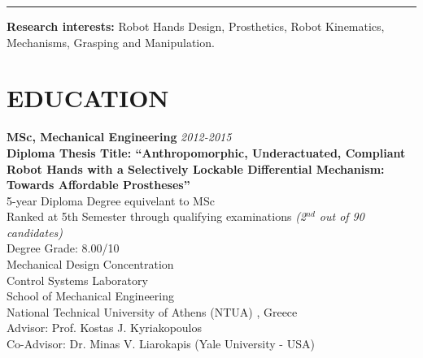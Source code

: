 \documentclass[11pt]{res} %
\begin{document}
\begin{resume}
\noindent\rule{16.6cm}{0.4pt}



\vspace{8pt} %

\textbf{Research interests:} Robot Hands Design, Prosthetics, Robot Kinematics, Mechanisms, Grasping and Manipulation.\\ 



\section{EDUCATION} 

\vspace{8pt} %

\small\textbf{MSc, Mechanical Engineering} \hfill {\sl 2012-2015}\\
\small\textbf{Diploma Thesis Title: ``Anthropomorphic, Underactuated, Compliant Robot Hands with a Selectively Lockable Differential Mechanism: Towards Affordable Prostheses''}\\
5-year Diploma Degree equivelant to MSc\\ Ranked at 5th Semester through qualifying examinations {\it(2$^{nd}$ out of 90 candidates)}\\%
Degree Grade: 8.00/10\\
Mechanical Design Concentration\\%
Control Systems Laboratory
\\%
School of Mechanical Engineering%
\\
National Technical University of Athens (NTUA)%
, Greece\\Advisor: %
Prof. Kostas J. Kyriakopoulos%
\\Co-Advisor: %
Dr. Minas V. Liarokapis (Yale University - USA)
 

\end{resume}
\end{document}

